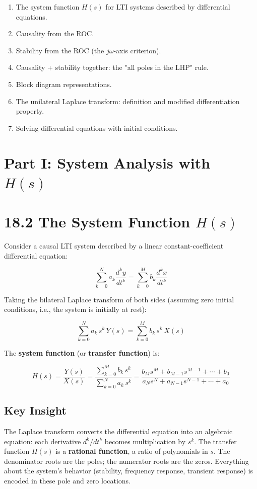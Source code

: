 \documentclass[11pt]{article}
\begin{document}
\begin{enumerate}
  \item The system function $H(s)$ for LTI systems described by differential equations.
  \item Causality from the ROC.
  \item Stability from the ROC (the $j\omega$-axis criterion).
  \item Causality + stability together: the "all poles in the LHP" rule.
  \item Block diagram representations.
  \item The unilateral Laplace transform: definition and modified differentiation property.
  \item Solving differential equations with initial conditions.
\end{enumerate}

\section*{Part I: System Analysis with $H(s)$}

\section*{18.2 The System Function $H(s)$}

Consider a causal LTI system described by a linear constant-coefficient differential equation:

\[\sum_{k=0}^{N} a_k \frac{d^k y}{dt^k} = \sum_{k=0}^{M} b_k \frac{d^k x}{dt^k}\]

Taking the bilateral Laplace transform of both sides (assuming zero initial conditions, i.e., the system is initially at rest):

\[\sum_{k=0}^{N} a_k\, s^k\, Y(s) = \sum_{k=0}^{M} b_k\, s^k\, X(s)\]

The \textbf{system function} (or \textbf{transfer function}) is:

\[H(s) = \frac{Y(s)}{X(s)} = \frac{\sum_{k=0}^{M} b_k\, s^k}{\sum_{k=0}^{N} a_k\, s^k} = \frac{b_M s^M + b_{M-1} s^{M-1} + \cdots + b_0}{a_N s^N + a_{N-1} s^{N-1} + \cdots + a_0}\]

\subsection*{Key Insight}

The Laplace transform converts the differential equation into an algebraic equation: each derivative $d^k/dt^k$ becomes multiplication by $s^k$. The transfer function $H(s)$ is a \textbf{rational function}, a ratio of polynomials in $s$. The denominator roots are the poles; the numerator roots are the zeros. Everything about the system's behavior (stability, frequency response, transient response) is encoded in these pole and zero locations.
\end{document}
